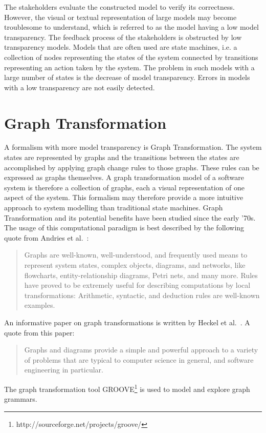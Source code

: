 The stakeholders evaluate the constructed model to verify its correctness. However, the visual or textual representation of large models may become troublesome to understand, which is referred to as the model having a low model transparency. The feedback process of the stakeholders is obstructed by low transparency models. Models that are often used are state machines, i.e. a collection of nodes representing the states of the system connected by transitions representing an action taken by the system. The problem in such models with a large number of states is the decrease of model transparency. Errors in models with a low transparency are not easily detected.

\section{Graph Transformation}
A formalism with more model transparency is Graph Transformation. The system states are represented by graphs and the transitions between the states are accomplished by applying graph change rules to those graphs. These rules can be expressed as graphs themselves. A graph transformation model of a software system is therefore a collection of graphs, each a visual representation of one aspect of the system. This formalism may therefore provide a more intuitive approach to system modelling than traditional state machines. Graph Transformation and its potential benefits have been studied since the early '70s. The usage of this computational paradigm is best described by the following quote from Andries et al.~\cite{Andries1999}: \begin{quote}Graphs are well-known, well-understood, and frequently used means to represent system states, complex objects, diagrams, and networks, like flowcharts, entity-relationship diagrams, Petri nets, and many more. Rules have proved to be extremely useful for describing computations by local transformations: Arithmetic, syntactic, and deduction rules are well-known examples.\end{quote} An informative paper on graph transformations is written by Heckel et al.~\cite{Heckel2006187}. A quote from this paper: \begin{quote}Graphs and diagrams provide a simple and powerful approach to a variety of problems that are typical to computer science in general, and software engineering in particular.\end{quote}

The graph transformation tool GROOVE\footnote{http://sourceforge.net/projects/groove/} is used to model and explore graph grammars.

